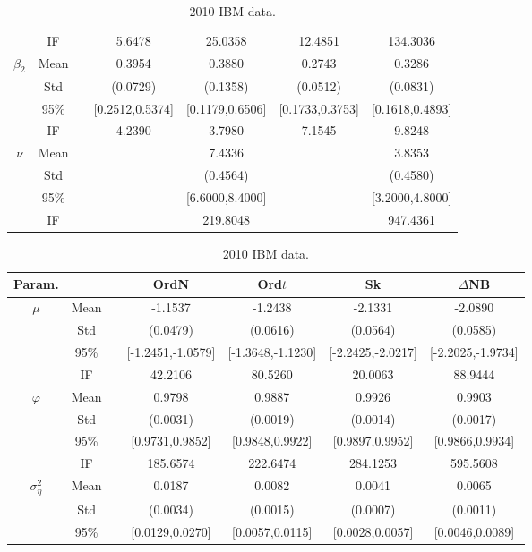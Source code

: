 \begin{table}
\begin{footnotesize}
\begin{singlespace}
{\begin{subtable}{0.8\textwidth}
\begin{tabular}{ccc cccc }
 & IF  &  &  5.6478  &  25.0358  &  12.4851  &  134.3036  \\ [1.0ex] 
 $\beta_2$   & Mean   &  &  0.3954  &  0.3880  &  0.2743  &  0.3286  \\  
 & Std   &  &  (0.0729)  &  (0.1358)  &  (0.0512)  &  (0.0831)  \\  
 & 95\%  &  &  [0.2512,0.5374]  &  [0.1179,0.6506]  &  [0.1733,0.3753]  &  [0.1618,0.4893]  \\  
 & IF  &  &  4.2390  &  3.7980  &  7.1545  &  9.8248  \\ [1.0ex] 
 $\nu$   & Mean   &  &  &  7.4336  &    &  3.8353  \\  
 & Std   &  &     &  (0.4564)  &     &  (0.4580)  \\  
 & 95\%  &  &    &  [6.6000,8.4000]  &   &  [3.2000,4.8000]  \\  
 & IF  &  &   &  219.8048  &    &  947.4361  \\ [1.0ex] 
\bottomrule 
\end{tabular}
 \caption{ 2010 IBM data.}
\label{tab:sim_res_2010_IBM} 
\end{subtable}
}
{
\begin{subtable}{0.8\textwidth}
\begin{tabular}{ccc cccc } 
\toprule 
Param. &&& OrdN  & Ord$t$ & Sk & $\Delta$NB \\ \hline
 $\mu$   & Mean   &  &  -1.1537  &  -1.2438  &  -2.1331  &  -2.0890  \\  
 & Std   &  &  (0.0479)  &  (0.0616)  &  (0.0564)  &  (0.0585)  \\  
 & 95\%  &  &  [-1.2451,-1.0579]  &  [-1.3648,-1.1230]  &  [-2.2425,-2.0217]  &  [-2.2025,-1.9734]  \\  
 & IF  &  &  42.2106  &  80.5260  &  20.0063  &  88.9444  \\ [1.0ex] 
 $\varphi$   & Mean   &  &  0.9798  &  0.9887  &  0.9926  &  0.9903  \\  
 & Std   &  &  (0.0031)  &  (0.0019)  &  (0.0014)  &  (0.0017)  \\  
 & 95\%  &  &  [0.9731,0.9852]  &  [0.9848,0.9922]  &  [0.9897,0.9952]  &  [0.9866,0.9934]  \\  
 & IF  &  &  185.6574  &  222.6474  &  284.1253  &  595.5608  \\ [1.0ex] 
 $\sigma^2_{\eta}$   & Mean   &  &  0.0187  &  0.0082  &  0.0041  &  0.0065  \\  
 & Std   &  &  (0.0034)  &  (0.0015)  &  (0.0007)  &  (0.0011)  \\  
 & 95\%  &  &  [0.0129,0.0270]  &  [0.0057,0.0115]  &  [0.0028,0.0057]  &  [0.0046,0.0089]  \\  

\end{tabular}
\end{subtable}}
\end{singlespace}
\end{footnotesize}
\end{table}
